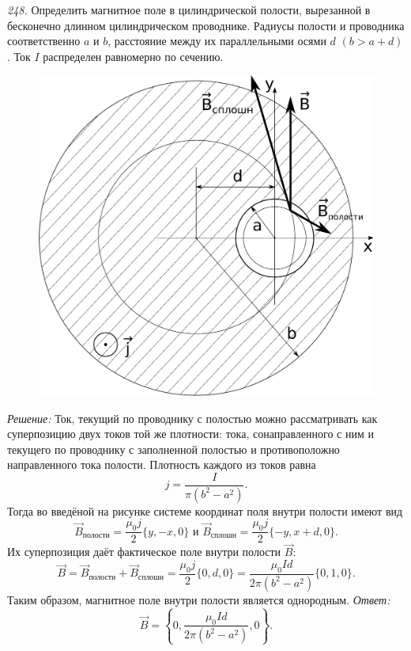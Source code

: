 \newpage
\emph{248.} Определить магнитное поле в цилиндрической полости, вырезанной в
бесконечно длинном цилиндрическом проводнике. Радиусы полости и проводника
соответственно \( a \) и \( b \), расстояние между их параллельными осями
\( d \) \( (b > a+ d) \). Ток \( I \) распределен равномерно по сечению.

\vspace*{2em}
\begin{figure}[h!]
    \center
    \includegraphics[width=.4\textwidth]{1-2}
\end{figure}
\emph{Решение:}
Ток, текущий по проводнику с полостью можно рассматривать как суперпозицию
двух токов той же плотности: тока, сонаправленного с ним и текущего по
проводнику с заполненной полостью и противоположно направленного тока
полости. Плотность каждого из токов равна
\[
    j = \frac{I}{\pi(b^2 - a^2)}.
\]
Тогда во введёной на рисунке системе координат поля внутри полости имеют вид
\[
    \vec{B}_\textit{полости} = \frac{\mu_0j}{2}\{y, -x, 0\} \text{ и }
    \vec{B}_\textit{сплошн} = \frac{\mu_0j}{2}\{-y, x+d, 0\}.
\]
Их суперпозиция даёт фактическое поле внутри полости \( \vec{B} \):
\[
    \vec{B} = \vec{B}_\textit{полости} + \vec{B}_\textit{сплошн} =
    \frac{\mu_0j}{2}\{0, d, 0\} = \frac{\mu_0 I d}{2\pi(b^2 - a^2)}\{0, 1, 0\}.
\]
Таким образом, магнитное поле внутри полости является однородным.
\vfill
\emph{Ответ:}
\[
    \vec{B} = \left\{0, \frac{\mu_0 I d}{2\pi(b^2 - a^2)}, 0\right\}.
\]

